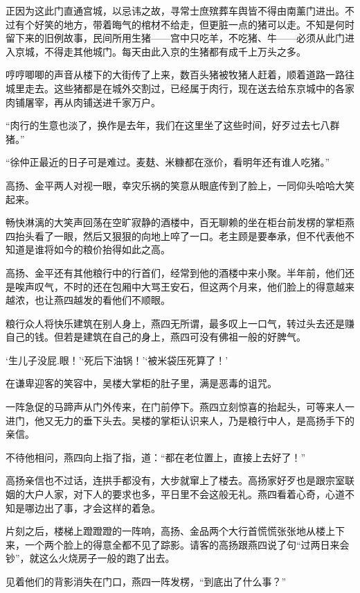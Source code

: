 正因为这此门直通宫城，以忌讳之故，寻常士庶殡葬车舆皆不得由南薰门进出。不过有个好笑的地方，带着晦气的棺材不给走，但更脏一点的猪可以走。不知是何时留下来的旧例故事，民间所用生猪——宫中只吃羊，不吃猪、牛——必须从此门进入京城，不得走其他城门。每天由此入京的生猪都有成千上万头之多。

哼哼唧唧的声音从楼下的大街传了上来，数百头猪被牧猪人赶着，顺着道路一路往城里走去。这些猪都是在城外交割过，已经属于肉行，现在送去给东京城中的各家肉铺屠宰，再从肉铺送进千家万户。

“肉行的生意也淡了，换作是去年，我们在这里坐了这些时间，好歹过去七八群猪。”

“徐仲正最近的日子可是难过。麦麸、米糠都在涨价，看明年还有谁人吃猪。”

高扬、金平两人对视一眼，幸灾乐祸的笑意从眼底传到了脸上，一同仰头哈哈大笑起来。

畅快淋漓的大笑声回荡在空旷寂静的酒楼中，百无聊赖的坐在柜台前发楞的掌柜燕四抬头看了一眼，然后又狠狠的向地上啐了一口。老主顾是要奉承，但不代表他不知道是谁将如今的粮价抬得如此之高。

高扬、金平还有其他粮行中的行首们，经常到他的酒楼中来小聚。半年前，他们还是唉声叹气，不时的还在包厢中大骂王安石，但这两个月来，他们脸上的得意越来越浓，也让燕四越发的看他们不顺眼。

粮行众人将快乐建筑在别人身上，燕四无所谓，最多叹上一口气，转过头去还是赚自己的钱。但若是建筑在自己的身上，燕四可没有佛祖一般的好脾气。

‘生儿子没屁.眼！’‘死后下油锅！’‘被米袋压死算了！’

在谦卑迎客的笑容中，吴楼大掌柜的肚子里，满是恶毒的诅咒。

一阵急促的马蹄声从门外传来，在门前停下。燕四立刻惊喜的抬起头，可等来人一进门，他又无力的垂下头去。吴楼的掌柜认识来人，乃是粮行中人，是高扬手下的亲信。

不待他相问，燕四向上指了指，道：“都在老位置上，直接上去好了！”

高扬亲信也不过话，连拱手都没有，大步就窜上了楼去。高扬家好歹也是跟宗室联姻的大户人家，对下人的要求也多，平日里不会这般无礼。燕四看着心奇，心道不知是哪边出了事，才会这样的着急。

片刻之后，楼梯上蹬蹬蹬的一阵响，高扬、金品两个大行首慌慌张张地从楼上下来，一个两个脸上的得意全都不见了踪影。请客的高扬跟燕四说了句“过两日来会钞”，就这么火烧房子一般的跑了出去。

见着他们的背影消失在门口，燕四一阵发楞，“到底出了什么事？”

